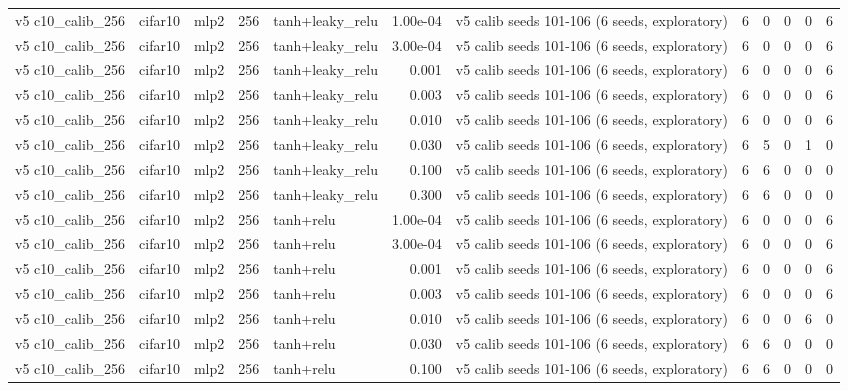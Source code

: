 \begin{table}[htbp]
{\begin{tabular}{@{}lllrlrlrrrrr@{}}
v5 c10\_calib\_256 & cifar10 & mlp2 & 256 & tanh+leaky\_relu & 1.00e-04 & v5 calib seeds 101-106 (6 seeds, exploratory) & 6 & 0 & 0 & 0 & 6 \\
v5 c10\_calib\_256 & cifar10 & mlp2 & 256 & tanh+leaky\_relu & 3.00e-04 & v5 calib seeds 101-106 (6 seeds, exploratory) & 6 & 0 & 0 & 0 & 6 \\
v5 c10\_calib\_256 & cifar10 & mlp2 & 256 & tanh+leaky\_relu & 0.001 & v5 calib seeds 101-106 (6 seeds, exploratory) & 6 & 0 & 0 & 0 & 6 \\
v5 c10\_calib\_256 & cifar10 & mlp2 & 256 & tanh+leaky\_relu & 0.003 & v5 calib seeds 101-106 (6 seeds, exploratory) & 6 & 0 & 0 & 0 & 6 \\
v5 c10\_calib\_256 & cifar10 & mlp2 & 256 & tanh+leaky\_relu & 0.010 & v5 calib seeds 101-106 (6 seeds, exploratory) & 6 & 0 & 0 & 0 & 6 \\
v5 c10\_calib\_256 & cifar10 & mlp2 & 256 & tanh+leaky\_relu & 0.030 & v5 calib seeds 101-106 (6 seeds, exploratory) & 6 & 5 & 0 & 1 & 0 \\
v5 c10\_calib\_256 & cifar10 & mlp2 & 256 & tanh+leaky\_relu & 0.100 & v5 calib seeds 101-106 (6 seeds, exploratory) & 6 & 6 & 0 & 0 & 0 \\
v5 c10\_calib\_256 & cifar10 & mlp2 & 256 & tanh+leaky\_relu & 0.300 & v5 calib seeds 101-106 (6 seeds, exploratory) & 6 & 6 & 0 & 0 & 0 \\
v5 c10\_calib\_256 & cifar10 & mlp2 & 256 & tanh+relu & 1.00e-04 & v5 calib seeds 101-106 (6 seeds, exploratory) & 6 & 0 & 0 & 0 & 6 \\
v5 c10\_calib\_256 & cifar10 & mlp2 & 256 & tanh+relu & 3.00e-04 & v5 calib seeds 101-106 (6 seeds, exploratory) & 6 & 0 & 0 & 0 & 6 \\
v5 c10\_calib\_256 & cifar10 & mlp2 & 256 & tanh+relu & 0.001 & v5 calib seeds 101-106 (6 seeds, exploratory) & 6 & 0 & 0 & 0 & 6 \\
v5 c10\_calib\_256 & cifar10 & mlp2 & 256 & tanh+relu & 0.003 & v5 calib seeds 101-106 (6 seeds, exploratory) & 6 & 0 & 0 & 0 & 6 \\
v5 c10\_calib\_256 & cifar10 & mlp2 & 256 & tanh+relu & 0.010 & v5 calib seeds 101-106 (6 seeds, exploratory) & 6 & 0 & 0 & 6 & 0 \\
v5 c10\_calib\_256 & cifar10 & mlp2 & 256 & tanh+relu & 0.030 & v5 calib seeds 101-106 (6 seeds, exploratory) & 6 & 6 & 0 & 0 & 0 \\
v5 c10\_calib\_256 & cifar10 & mlp2 & 256 & tanh+relu & 0.100 & v5 calib seeds 101-106 (6 seeds, exploratory) & 6 & 6 & 0 & 0 & 0 \\

\end{tabular}}
\end{table}
